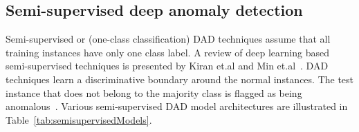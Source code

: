 \subsection{Semi-supervised deep anomaly detection }
\label{sec:semi_supervised_DAD}
Semi-supervised or (one-class classification) DAD techniques assume that all training instances have only one class label.  A review of deep learning based semi-supervised techniques is presented by Kiran et.al and Min et.al~\cite{kiran2018overview,min2018ids}. DAD techniques learn a discriminative boundary around the normal instances. The test instance that does not belong to the majority class is flagged as being anomalous~\cite{perera2018learning,blanchard2010semi}. Various  semi-supervised DAD model architectures are illustrated in Table~\ref{tab:semisupervisedModels}.

